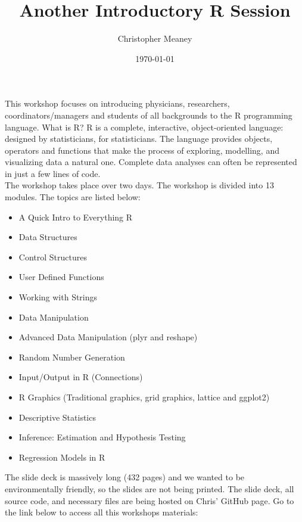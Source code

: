 \documentclass[10pt, a4paper]{article}\usepackage[]{graphicx}\usepackage[]{color}
\title{Another Introductory R Session}
\author{Christopher Meaney}
\date{\today}
\begin{document}
\maketitle

This workshop focuses on introducing physicians, researchers, coordinators/managers and students of all backgrounds to the R programming language. What is R? R is a complete, interactive, object-oriented language: designed by statisticians, for statisticians. The language provides objects, operators and functions that make the process of exploring, modelling, and visualizing data a natural one. Complete data analyses can often be represented in just a few lines of code. \\

The workshop takes place over two days. The workshop is divided into 13 modules. The topics are listed below: \\

\begin{itemize}
\item A Quick Intro to Everything R 
\item Data Structures 
\item Control Structures
\item User Defined Functions
\item Working with Strings
\item Data Manipulation 
\item Advanced Data Manipulation (plyr and reshape)
\item Random Number Generation
\item Input/Output in R (Connections)
\item R Graphics (Traditional graphics, grid graphics, lattice and ggplot2)
\item Descriptive Statistics
\item Inference: Estimation and Hypothesis Testing
\item Regression Models in R
\end{itemize}

The slide deck is massively long (432 pages) and we wanted to be environmentally friendly, so the slides are not being printed. The slide deck, all source code, and necessary files are being hosted on Chris' GitHub page. Go to the link below to access all this workshops materials: \\
\end{document}

